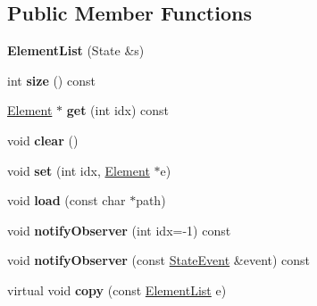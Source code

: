 \subsection*{Public Member Functions}
\begin{DoxyCompactItemize}
\item 
\mbox{\label{classstate_1_1_element_list_abfb38469f7e90e8720147d043cfc99ec}} 
{\bfseries Element\+List} (State \&s)
\item 
\mbox{\label{classstate_1_1_element_list_a5e102ac6024b29c48cd49f23eb8042cd}} 
int {\bfseries size} () const
\item 
\mbox{\label{classstate_1_1_element_list_a648771be9fb8138c196d3e162e5cbd7c}} 
\hyperlink{classstate_1_1_element}{Element} $\ast$ {\bfseries get} (int idx) const
\item 
\mbox{\label{classstate_1_1_element_list_af07efd90cd2550b9ea44287048538ad9}} 
void {\bfseries clear} ()
\item 
\mbox{\label{classstate_1_1_element_list_aabd6dc6f23c94a1c21db6d6db48838f2}} 
void {\bfseries set} (int idx, \hyperlink{classstate_1_1_element}{Element} $\ast$e)
\item 
\mbox{\label{classstate_1_1_element_list_a4a888273d17492d5d3132fd0bb3b7cae}} 
void {\bfseries load} (const char $\ast$path)
\item 
\mbox{\label{classstate_1_1_element_list_a136fb0b20e84efaf1b2b41961a278136}} 
void {\bfseries notify\+Observer} (int idx=-\/1) const
\item 
\mbox{\label{classstate_1_1_element_list_a49172e41af579b32a416383e2642a727}} 
void {\bfseries notify\+Observer} (const \hyperlink{classstate_1_1_state_event}{State\+Event} \&event) const
\item 
\mbox{\label{classstate_1_1_element_list_a4913f46a63b8d669251f8f0ab4ba5416}} 
virtual void {\bfseries copy} (const \hyperlink{classstate_1_1_element_list}{Element\+List} e)
\end{DoxyCompactItemize}
